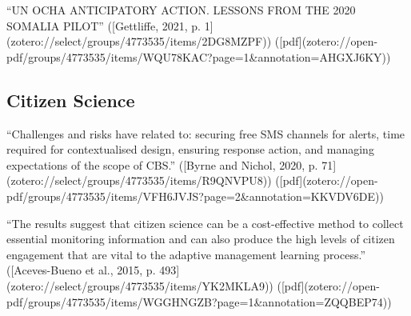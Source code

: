 “UN OCHA ANTICIPATORY ACTION. LESSONS FROM THE 2020 SOMALIA PILOT” ([Gettliffe, 2021, p. 1](zotero://select/groups/4773535/items/2DG8MZPF)) ([pdf](zotero://open-pdf/groups/4773535/items/WQU78KAC?page=1&annotation=AHGXJ6KY))



\subsection{Citizen Science}





“Challenges and risks have related to: securing free SMS channels for alerts, time required for contextualised design, ensuring response action, and managing expectations of the scope of CBS.” ([Byrne and Nichol, 2020, p. 71](zotero://select/groups/4773535/items/R9QNVPU8)) ([pdf](zotero://open-pdf/groups/4773535/items/VFH6JVJS?page=2&annotation=KKVDV6DE))



“The results suggest that citizen science can be a cost-effective method to collect essential monitoring information and can also produce the high levels of citizen engagement that are vital to the adaptive management learning process.” ([Aceves-Bueno et al., 2015, p. 493](zotero://select/groups/4773535/items/YK2MKLA9)) ([pdf](zotero://open-pdf/groups/4773535/items/WGGHNGZB?page=1&annotation=ZQQBEP74))

